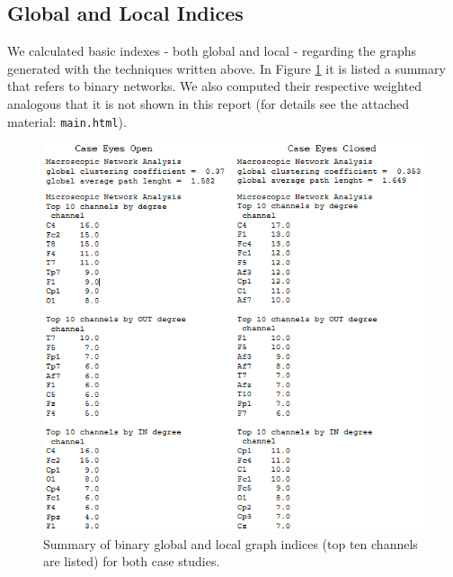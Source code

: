 \documentclass[%
 aip,
 jmp,%
 amsmath,amssymb,
 reprint,%
]{revtex4-1}
\begin{document}
\subsection{\label{sec:level2}Global and Local Indices}

We calculated basic indexes - both global and local - regarding the graphs generated with the techniques written above. In Figure \ref{fig:summary2} it is listed a summary that refers to binary networks. We also computed their respective weighted analogous that it is not shown in this report (for details see the attached material: \verb|main.html|).

\begin{figure}
	\centering
	\includegraphics[width=1\linewidth]{../summary_2}
	\caption[didascalia breve]{Summary of binary global and local graph indices (top ten channels are listed) for both case studies.}
	\label{fig:summary2}
\end{figure}
\end{document}
